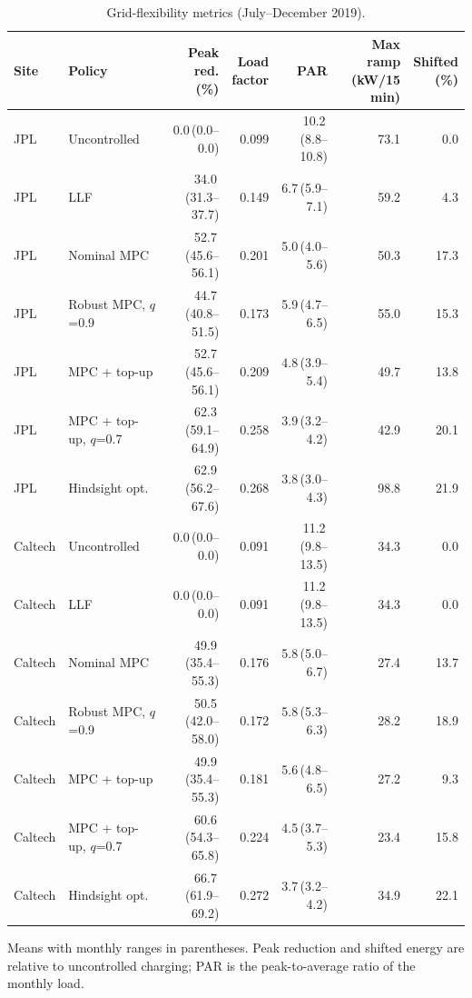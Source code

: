 \begin{table}[!htbp]
\centering
\caption{Grid-flexibility metrics (July--December 2019).}
\label{tab:flex}
\footnotesize
\setlength{\tabcolsep}{1.5pt}
\begin{tabular*}{\textwidth}{@{\extracolsep{\fill}}llrrrrr@{}}
\hline
Site & Policy & \makecell[c]{Peak\\red. (\%)} & \makecell[c]{Load\\factor} & PAR & \makecell[c]{Max ramp\\(kW/15 min)} & \makecell[c]{Shifted\\(\%)} \\
\hline
JPL & Uncontrolled & 0.0\,{\scriptsize(0.0--0.0)} & 0.099 & 10.2\,{\scriptsize(8.8--10.8)} & 73.1 & 0.0 \\
JPL & LLF & 34.0\,{\scriptsize(31.3--37.7)} & 0.149 & 6.7\,{\scriptsize(5.9--7.1)} & 59.2 & 4.3 \\
JPL & Nominal MPC & 52.7\,{\scriptsize(45.6--56.1)} & 0.201 & 5.0\,{\scriptsize(4.0--5.6)} & 50.3 & 17.3 \\
JPL & Robust MPC, $q$=0.9 & 44.7\,{\scriptsize(40.8--51.5)} & 0.173 & 5.9\,{\scriptsize(4.7--6.5)} & 55.0 & 15.3 \\
JPL & MPC + top-up & 52.7\,{\scriptsize(45.6--56.1)} & 0.209 & 4.8\,{\scriptsize(3.9--5.4)} & 49.7 & 13.8 \\
JPL & MPC + top-up, $q$=0.7 & 62.3\,{\scriptsize(59.1--64.9)} & 0.258 & 3.9\,{\scriptsize(3.2--4.2)} & 42.9 & 20.1 \\
JPL & Hindsight opt. & 62.9\,{\scriptsize(56.2--67.6)} & 0.268 & 3.8\,{\scriptsize(3.0--4.3)} & 98.8 & 21.9 \\
\hline
Caltech & Uncontrolled & 0.0\,{\scriptsize(0.0--0.0)} & 0.091 & 11.2\,{\scriptsize(9.8--13.5)} & 34.3 & 0.0 \\
Caltech & LLF & 0.0\,{\scriptsize(0.0--0.0)} & 0.091 & 11.2\,{\scriptsize(9.8--13.5)} & 34.3 & 0.0 \\
Caltech & Nominal MPC & 49.9\,{\scriptsize(35.4--55.3)} & 0.176 & 5.8\,{\scriptsize(5.0--6.7)} & 27.4 & 13.7 \\
Caltech & Robust MPC, $q$=0.9 & 50.5\,{\scriptsize(42.0--58.0)} & 0.172 & 5.8\,{\scriptsize(5.3--6.3)} & 28.2 & 18.9 \\
Caltech & MPC + top-up & 49.9\,{\scriptsize(35.4--55.3)} & 0.181 & 5.6\,{\scriptsize(4.8--6.5)} & 27.2 & 9.3 \\
Caltech & MPC + top-up, $q$=0.7 & 60.6\,{\scriptsize(54.3--65.8)} & 0.224 & 4.5\,{\scriptsize(3.7--5.3)} & 23.4 & 15.8 \\
Caltech & Hindsight opt. & 66.7\,{\scriptsize(61.9--69.2)} & 0.272 & 3.7\,{\scriptsize(3.2--4.2)} & 34.9 & 22.1 \\
\hline
\end{tabular*}
\par\smallskip\parbox{\textwidth}{\scriptsize Means with monthly ranges in parentheses. Peak reduction and shifted energy are relative to uncontrolled charging; PAR is the peak-to-average ratio of the monthly load.}
\end{table}
